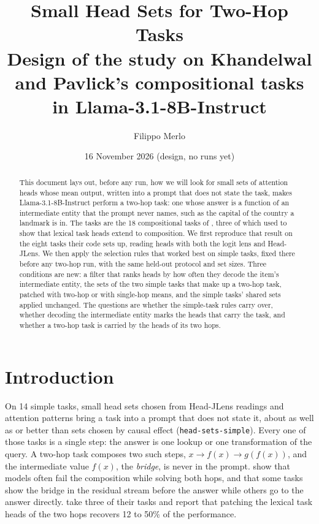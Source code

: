 \documentclass[10pt,a4paper]{article}
\title{Small Head Sets for Two-Hop Tasks\\[2pt]
\large Design of the study on Khandelwal and Pavlick's compositional tasks in Llama-3.1-8B-Instruct}
\author{Filippo Merlo}
\date{16 November 2026 (design, no runs yet)}
\begin{document}
\maketitle

\begin{abstract}
This document lays out, before any run, how we will look for small sets of attention heads whose mean output, written into a prompt that does not state the task, makes Llama-3.1-8B-Instruct perform a two-hop task: one whose answer is a function of an intermediate entity that the prompt never names, such as the capital of the country a landmark is in. The tasks are the 18 compositional tasks of \citet{khandelwal2026compose}, three of which \citet{yang2026shared} used to show that lexical task heads extend to composition. We first reproduce that result on the eight tasks their code sets up, reading heads with both the logit lens and Head-JLens. We then apply the selection rules that worked best on simple tasks, fixed there before any two-hop run, with the same held-out protocol and set sizes. Three conditions are new: a filter that ranks heads by how often they decode the item's intermediate entity, the sets of the two simple tasks that make up a two-hop task, patched with two-hop or with single-hop means, and the simple tasks' shared sets applied unchanged. The questions are whether the simple-task rules carry over, whether decoding the intermediate entity marks the heads that carry the task, and whether a two-hop task is carried by the heads of its two hops.
\end{abstract}

\section{Introduction}

On 14 simple tasks, small head sets chosen from Head-JLens readings and attention patterns bring a task into a prompt that does not state it, about as well as or better than sets chosen by causal effect (\texttt{head-sets-simple}). Every one of those tasks is a single step: the answer is one lookup or one transformation of the query. A two-hop task composes two such steps, $x \to f(x) \to g(f(x))$, and the intermediate value $f(x)$, the \emph{bridge}, is never in the prompt. \citet{khandelwal2026compose} show that models often fail the composition while solving both hops, and that some tasks show the bridge in the residual stream before the answer while others go to the answer directly. \citet[Sec.~2.5.1, App.~M]{yang2026shared} take three of their tasks and report that patching the lexical task heads of the two hops recovers 12 to 50\% of the performance.
\end{document}
